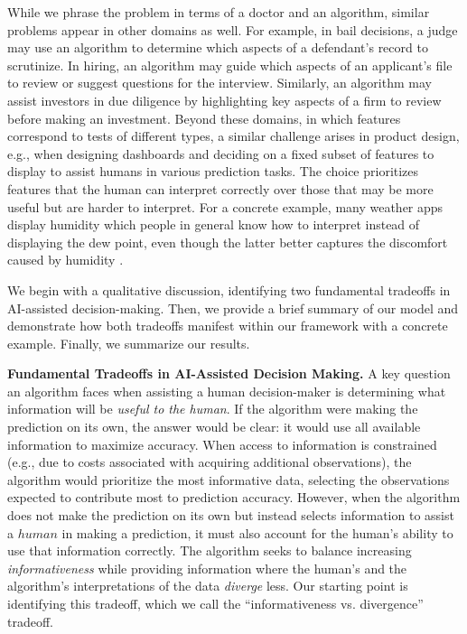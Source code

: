 While we phrase the problem in terms of a doctor and an algorithm, similar problems appear in other domains as well. For example, in bail decisions, a judge may use an algorithm to determine which aspects of a defendant’s record to scrutinize. In hiring, an algorithm may guide which aspects of an applicant's file to review or suggest questions for the interview. Similarly, an algorithm may assist investors in due diligence by highlighting key aspects of a firm to review before making an investment. 
Beyond these domains, in which features correspond to tests of different types, a similar challenge arises in product design, e.g., 
when designing dashboards and deciding on a fixed subset of features to display to assist humans in various prediction tasks. 
The choice prioritizes features that the human can interpret correctly over those that may be more useful but are harder to interpret. For a concrete example, many weather apps display humidity which people in general know how to interpret instead of displaying the dew point, even though the latter better captures the discomfort caused by humidity \cite{NOAA_DewPoint}.

We begin with a qualitative discussion, identifying two fundamental tradeoffs in AI-assisted decision-making. Then, we provide a brief summary of our model and demonstrate how both tradeoffs manifest within our framework with a concrete example. Finally, we summarize our results. %




\vspace{5pt} \noindent  \textbf{Fundamental Tradeoffs in AI-Assisted Decision Making.}
A key question an algorithm faces when assisting a human decision-maker is determining what information will be {\em useful to the human}. If the algorithm were making the prediction on its own, the answer would be clear: it would use all available information to maximize accuracy. When access to information is constrained (e.g., due to costs associated with acquiring additional observations), the algorithm would prioritize the most informative data, selecting the observations expected to contribute most to prediction accuracy. However, when the algorithm does not make the prediction on its own but instead  selects information to assist a $human$ in making a prediction, it must also account for the human's ability to use that information correctly. %
The algorithm seeks to balance increasing {\em informativeness} while providing information where the human's and the algorithm's interpretations of the data {\em diverge} less. Our starting point is identifying this tradeoff, which we call the ``informativeness vs. divergence'' tradeoff.


